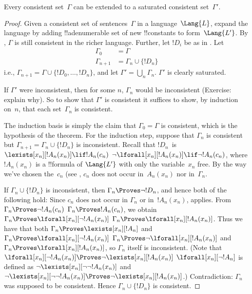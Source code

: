 \documentclass[../../../include/open-logic-section]{subfiles}
\begin{document}
\begin{lem}
Every consistent set~$\Gamma$ can be extended to a saturated
consistent set~$\Gamma'$.
\end{lem}

\begin{proof}
Given a consistent set of sentences~$\Gamma$ in a language~$\Lang{L}$,
expand the language by adding !!a{denumerable} set of new
!!{constant}s to form~$\Lang{L'}$.  By , $\Gamma$
is still consistent in the richer language.  Further, let $!D_i$ be as
in .  Let
\begin{align*}
\Gamma_0 & = \Gamma \\
\Gamma_{n+1} & = \Gamma_n \cup \{!D_n \}
\end{align*}
i.e., $\Gamma_{n+1} = \Gamma \cup \{ !D_0, \dots, !D_n \}$, and let
$\Gamma' = \bigcup_{n} \Gamma_n$.  $\Gamma'$ is clearly saturated.

If $\Gamma'$ were inconsistent, then for some $n$, $\Gamma_n$ would be
inconsistent (Exercise: explain why).  So to show that $\Gamma'$ is
consistent it suffices to show, by induction on~$n$, that each
set~$\Gamma_n$ is consistent.

The induction basis is simply the claim that $\Gamma_0 = \Gamma$ is
consistent, which is the hypothesis of the theorem.  For the induction
step, suppose that $\Gamma_{n}$ is consistent but $\Gamma_{n+1} =
\Gamma_n \cup \{!D_n\}$ is inconsistent.  Recall that $!D_n$~is
{$\lexists[x_{n}][!A_{n}(x_n)] \lif !A_{n}(c_{n})$}
{$\lnot\lforall[x_{n}][!A_{n}(x_n)] \lif \lnot !A_{n}(c_{n})$},
where $!A_n(x_n)$ is a !!{formula} of $\Lang{L'}$ with only the
variable~$x_n$ free. By the way we've chosen the~$c_n$ (see
, $c_n$ does not occur in~$A_n(x_n)$ nor
in~$\Gamma_n$.

If $\Gamma_n \cup \{!D_n\}$ is inconsistent, then $\Gamma_n
\Proves \lnot !D_n$, and hence both of the following hold:
Since $c_n$ does not occur in
$\Gamma_n$ or in~$!A_n(x_n)$, 
 applies.
From 
{$\Gamma_n \Proves \lnot !A_n(c_n)$}
{$\Gamma_n \Proves !A_n(c_n)$},
we obtain
{$\Gamma_n \Proves \lforall[x_n][\lnot !A_n(x_n)]$}
{$\Gamma_n \Proves \lforall[x_n][!A_n(x_n)]$}.
Thus we have that both
{$\Gamma_n \Proves \lexists[x_n][!A_n]$ and
$\Gamma_n \Proves \lforall[x_n][\lnot !A_n(x_n)]$}
{$\Gamma_n \Proves \lnot\lforall[x_n][!A_n(x_n)]$ and
$\Gamma_n \Proves \lforall[x_n][!A_n(x_n)]$},
so $\Gamma_n$ itself is inconsistent.
{(Note that
{$\lforall[x_n][\lnot !A_n(x_n)] \Proves
  \lnot\lexists[x_n][!A_n(x_n)]$}
{$\lforall[x_n][\lnot !A_n]$ is defined as
  $\lnot\lexists[x_n][\lnot\lnot !A_n(x_n)]$ and
  $\lnot\lexists[x_n][\lnot\lnot !A_n(x_n)] \Proves
  \lnot\lexists[x_n][!A_n(x_n)]$}.)}{}
Contradiction: $\Gamma_n$ was supposed to be consistent.  Hence
$\Gamma_n \cup \{ !D_n\}$ is consistent.
\end{proof}
\end{document}

